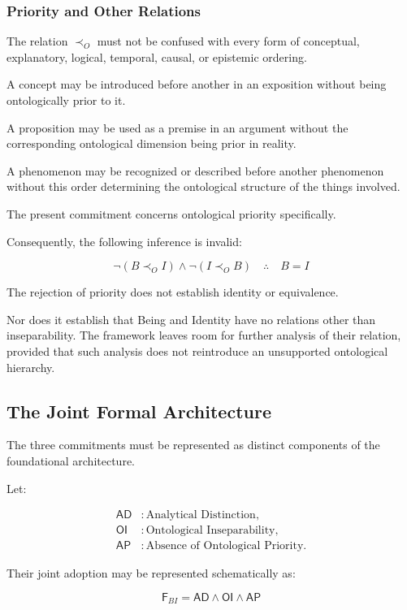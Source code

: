 \subsubsection{Priority and Other Relations}

The relation \(\prec_O\) must not be confused
with every form of conceptual, explanatory,
logical, temporal, causal, or epistemic
ordering.

A concept may be introduced before another
in an exposition without being ontologically
prior to it.

A proposition may be used as a premise
in an argument without the corresponding
ontological dimension being prior in reality.

A phenomenon may be recognized or described
before another phenomenon without this
order determining the ontological structure
of the things involved.

The present commitment concerns ontological
priority specifically.

Consequently, the following inference is
invalid:

\[
\neg(B\prec_O I)
\land
\neg(I\prec_O B)
\quad \therefore \quad
B = I
\]

The rejection of priority does not establish
identity or equivalence.

Nor does it establish that Being and Identity
have no relations other than inseparability.
The framework leaves room for further
analysis of their relation, provided that
such analysis does not reintroduce an
unsupported ontological hierarchy.

\subsection{The Joint Formal Architecture}

The three commitments must be represented
as distinct components of the foundational
architecture.

Let:

\[
\begin{aligned}
\mathsf{AD} &:
\text{Analytical Distinction},\\
\mathsf{OI} &:
\text{Ontological Inseparability},\\
\mathsf{AP} &:
\text{Absence of Ontological Priority}.
\end{aligned}
\]

Their joint adoption may be represented
schematically as:

\[
\mathsf{F}_{BI}
=
\mathsf{AD}
\land
\mathsf{OI}
\land
\mathsf{AP}
\]

